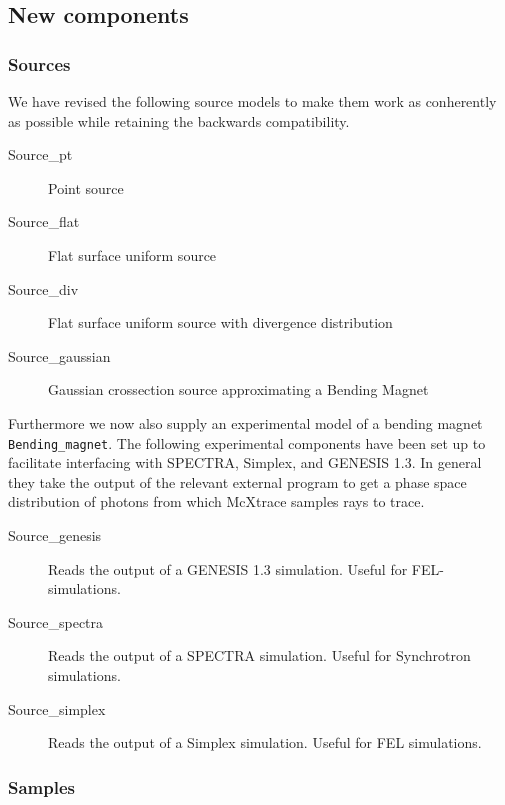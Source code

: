 \subsection{New components}

\subsubsection*{Sources}
We have revised the following source models to make them work as conherently as possible while retaining the backwards compatibility.
\begin{description}
\item[Source\_pt] Point source
\item[Source\_flat] Flat surface uniform source
\item[Source\_div] Flat surface uniform source with divergence distribution
\item[Source\_gaussian] Gaussian crossection source approximating a Bending Magnet
\end{description}
Furthermore we now also supply an experimental model of a bending magnet \texttt{Bending\_magnet}.
The following experimental components have been set up to facilitate interfacing with SPECTRA, Simplex, and GENESIS 1.3.
In general they take the output of the relevant external program to get a phase space distribution of photons from which McXtrace samples rays
to trace.
\begin{description}
\item[Source\_genesis] Reads the output of a GENESIS 1.3 simulation. Useful for FEL-simulations. 
\item[Source\_spectra] Reads the output of a SPECTRA simulation. Useful for Synchrotron simulations.
\item[Source\_simplex] Reads the output of a Simplex simulation. Useful for FEL simulations.
\end{description}

\subsubsection*{Samples}
\begin{description}
\end{description}
